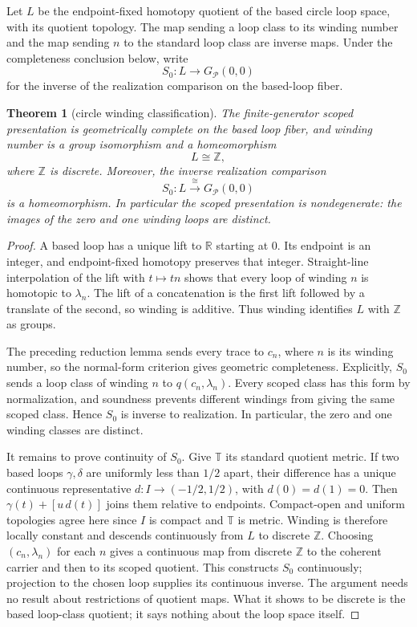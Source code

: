 \documentclass[10pt,reqno]{amsart}
\theoremstyle{definition}
\theoremstyle{plain}
\newtheorem{theorem}[definition]{Theorem}
\theoremstyle{remark}
\newcommand{\Z}{\mathbb Z}
\begin{document}
Let $L$ be the endpoint-fixed homotopy quotient of the based circle loop space,
with its quotient topology.  The map sending a loop class to its winding
number and the map
sending $n$ to the standard loop class are inverse maps.
Under the completeness conclusion below, write
\[
  S_0:L\longrightarrow G_{\mathcal P}(0,0)
\]
for the inverse of the realization comparison on the based-loop fiber.

\begin{theorem}[circle winding classification]
\label{thm:circle-winding}
The finite-generator scoped presentation is geometrically complete on the
based loop fiber, and winding number is a group isomorphism and a
homeomorphism
\[
  L\cong\Z,
\]
where $\Z$ is discrete.
Moreover, the inverse realization comparison
\[
  S_0:L\xrightarrow{\ \cong\ }G_{\mathcal P}(0,0)
\]
is a homeomorphism.  In particular the scoped presentation is
nondegenerate: the images of the zero and one winding loops are distinct.
\end{theorem}

\begin{proof}
A based loop has a unique lift to $\mathbb R$ starting at $0$.
Its endpoint is an integer, and endpoint-fixed homotopy preserves that
integer.  Straight-line interpolation of the lift with $t\mapsto tn$
shows that every loop of winding $n$ is homotopic to $\lambda_n$.
The lift of a concatenation is the first lift followed by a translate of the
second, so winding is additive.  Thus winding identifies $L$ with $\mathbb Z$
as groups.

The preceding reduction lemma sends every trace to $c_n$, where $n$ is
its winding number, so the normal-form criterion gives geometric
completeness.  Explicitly, $S_0$ sends a loop class of winding $n$ to
$q(c_n,\lambda_n)$.  Every scoped class has this form by normalization,
and soundness prevents different windings from giving the same scoped
class.  Hence $S_0$ is inverse to realization.  In particular, the zero
and one winding classes are distinct.



It remains to prove continuity of $S_0$.  Give $\mathbb T$ its standard
quotient metric.  If two based loops $\gamma,\delta$ are uniformly less
than $1/2$ apart, their difference has a unique continuous representative
$d:I\to(-1/2,1/2)$, with $d(0)=d(1)=0$.
Then $\gamma(t)+[u\,d(t)]$ joins them relative to endpoints.
Compact-open and uniform topologies agree here since $I$ is compact and
$\mathbb T$ is metric.  Winding is therefore locally constant and descends
continuously from $L$ to discrete $\Z$.
Choosing $(c_n,\lambda_n)$ for each $n$ gives a continuous map from
discrete $\Z$ to the coherent carrier and then to its scoped quotient.
This constructs $S_0$ continuously; projection to the chosen loop
supplies its continuous inverse.  The argument needs no result about
restrictions of quotient maps.  What it shows to be discrete is the based
loop-class quotient; it says nothing about the loop space itself.
\end{proof}
\end{document}
